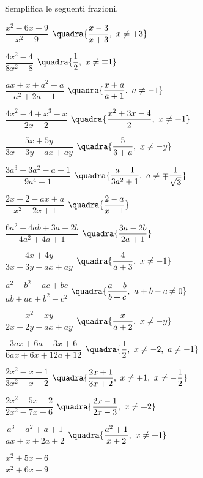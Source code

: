 \begin{esercizio}[\Ast]
\label{ese:19.5}
Semplifica le seguenti frazioni.
\begin{multicols}{2}
\begin{enumeratea}
 \item \(\dfrac{x^{2}-6x+9}{x^{2}-9}\)
  \hfill {\footnotesize \(\quadra{\dfrac{x-3}{x+3},~ x \neq +3}\)}
 \item \(\dfrac{4x^{2}-4}{8x^{2}-8}\)
  \hfill {\footnotesize \(\quadra{\dfrac{1}{2},~ x \neq \mp 1}\)}
 \item \(\dfrac{ax+x+a^{2}+a}{a^{2}+2a+1}\)
  \hfill {\footnotesize \(\quadra{\dfrac{x+a}{a+1},~ a \neq -1}\)}
 \item \(\dfrac{4x^{2}-4+x^{3}-x}{2x+2}\)
  \hfill {\footnotesize \(\quadra{\dfrac{x^{2}+3x-4}{2},~ x \neq -1}\)}
 \item \(\dfrac{5x+5y}{3x+3y+ax+ay}\)
  \hfill {\footnotesize \(\quadra{\dfrac{5}{3+a},~ x \neq -y}\)}
 \item \(\dfrac{3a^{3}-3a^{2}-a+1}{9a^{4}-1}\)
  \hfill {\footnotesize \(\quadra{\dfrac{a-1}{3a^{2}+1},~ 
                                 a \neq \mp \dfrac{1}{\sqrt{3}}}\)}
 \item \(\dfrac{2x-2-ax+a}{x^{2}-2x+1}\)
  \hfill {\footnotesize \(\quadra{\dfrac{2-a}{x-1}}\)}
 \item \(\dfrac{6a^{2}-4ab+3a-2b}{4a^{2}+4a+1}\)
  \hfill {\footnotesize \(\quadra{\dfrac{3a-2b}{2a+1}}\)}
 \item \(\dfrac{4x+4y}{3x+3y+ax+ay}\)
  \hfill {\footnotesize \(\quadra{\dfrac{4}{a+3},~ x \neq -1 }\)}
 \item \(\dfrac{a^{2}-b^{2}-ac+bc}{ab+ac+b^{2}-c^{2}}\)
  \hfill {\footnotesize \(\quadra{\dfrac{a-b}{b+c},~ a+b-c \neq 0}\)}
 \item \(\dfrac{x^{2}+xy}{2x+2y+ax+ay}\)
  \hfill {\footnotesize \(\quadra{\dfrac{x}{a+2},~ x \neq -y}\)}
 \item \(\dfrac{3ax+6a+3x+6}{6ax+6x+12a+12}\)
  \hfill {\footnotesize \(\quadra{\dfrac{1}{2},~ x \neq -2,~a \neq -1}\)}
 \item \(\dfrac{2x^{2}-x-1}{3x^{2}-x-2}\)
  \hfill {\footnotesize \(\quadra{\dfrac{2x+1}{3x+2},~ x \neq +1,~x \neq 
-\dfrac{1}{2}}\)}
 \item \(\dfrac{2x^{2}-5x+2}{2x^{2}-7x+6}\)
  \hfill {\footnotesize \(\quadra{\dfrac{2x-1}{2x-3},~ x \neq +2}\)}
 \item \(\dfrac{a^{3}+a^{2}+a+1}{ax+x+2a+2}\)
  \hfill {\footnotesize \(\quadra{\dfrac{a^2+1}{x+2},~ x \neq +1} \)}
 \item \(\dfrac{x^{2}+5x+6}{x^{2}+6x+9}\)

\end{enumeratea}
\end{multicols}
\end{esercizio}
